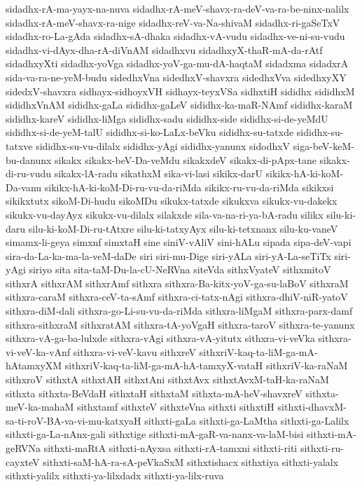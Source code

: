 {sidadhx-rA-ma-yayx-na-nuva
sidadhx-rA-meV-shavx-ra-deV-va-ra-be-ninx-nalilx
sidadhx-rA-meV-shavx-ra-nige
sidadhx-reV-va-Na-shivaM
sidadhx-ri-gaSeTxV
sidadhx-ro-La-gAda
sidadhx-sA-dhaka
sidadhx-vA-vudu
sidadhx-ve-ni-su-vudu
sidadhx-vi-dAyx-dha-rA-diVnAM
sidadhxvu
sidadhxyX-thaR-mA-da-rAtf
sidadhxyXti
sidadhx-yoVga
sidadhx-yoV-ga-mu-dA-haqtaM
sidadxma
sidadxrA
sida-va-ra-ne-yeM-budu
sidedhxVna
sidedhxV-shavxra
sidedhxVva
sidedhxyXY
sidedxV-shavxra
sidhayx-sidhoyxVH
sidhayx-teyxVSa
sidhxtiH
sididhx
sididhxM
sididhxVnAM
sididhx-gaLa
sididhx-gaLeV
sididhx-ka-maR-NAmf
sididhx-karaM
sididhx-kareV
sididhx-liMga
sididhx-sadu
sididhx-side
sididhx-si-de-yeMdU
sididhx-si-de-yeM-talU
sididhx-si-ko-LaLx-beVku
sididhx-su-tatxde
sididhx-su-tatxve
sididhx-su-vu-dilalx
sididhx-yAgi
sididhx-yanunx
sidodhxV
siga-beV-keM-bu-danunx
sikakx
sikakx-beV-Da-veMdu
sikakxdeV
sikakx-di-pApx-tane
sikakx-di-ru-vudu
sikakx-lA-radu
sikathxM
sika-vi-lasi
sikikx-darU
sikikx-hA-ki-koM-Da-vanu
sikikx-hA-ki-koM-Di-ru-vu-da-riMda
sikikx-ru-vu-da-riMda
sikikxsi
sikikxtutx
sikoM-Di-hudu
sikoMDu
sikukx-tatxde
sikukxva
sikukx-vu-dakekx
sikukx-vu-dayAyx
sikukx-vu-dilalx
silakxde
sila-va-na-ri-ya-bA-radu
silikx
silu-ki-daru
silu-ki-koM-Di-ru-tAtxre
silu-ki-tatxyAyx
silu-ki-tetxnanx
silu-ku-vaneV
simamx-li-geya
simxnf
simxtaH
sine
siniV-vAliV
sini-hALu
sipada
sipa-deV-vapi
sira-da-La-ka-ma-la-veM-daDe
siri
siri-mu-Dige
siri-yALa
siri-yA-La-seTiTx
siri-yAgi
siriyo
sita
sita-taM-Du-la-cU-NeRVna
siteVda
sithxVyateV
sithxmitoV
sithxrA
sithxrAM
sithxrAmf
sithxra
sithxra-Ba-kitx-yoV-ga-su-laBoV
sithxraM
sithxra-caraM
sithxra-ceV-ta-sAmf
sithxra-ci-tatx-nAgi
sithxra-dhiV-niR-yatoV
sithxra-diM-dali
sithxra-go-Li-su-vu-da-riMda
sithxra-liMgaM
sithxra-parx-damf
sithxra-sithxraM
sithxratAM
sithxra-tA-yoVgaH
sithxra-taroV
sithxra-te-yanunx
sithxra-vA-ga-ba-lulxde
sithxra-vAgi
sithxra-vA-yitutx
sithxra-vi-veVka
sithxra-vi-veV-ka-vAnf
sithxra-vi-veV-kavu
sithxreV
sithxriV-kaq-ta-liM-ga-mA-hAtamxyXM
sithxriV-kaq-ta-liM-ga-mA-hA-tamxyX-vataH
sithxriV-ka-raNaM
sithxroV
sithxtA
sithxtAH
sithxtAni
sithxtAvx
sithxtAvxM-taH-ka-raNaM
sithxta
sithxta-BeVdaH
sithxtaH
sithxtaM
sithxta-mA-heV-shavxreV
sithxta-meV-ka-mahaM
sithxtamf
sithxteV
sithxteVna
sithxti
sithxtiH
sithxti-dhavxM-sa-ti-roV-BA-va-vi-mu-katxyaH
sithxti-gaLa
sithxti-ga-LaMtha
sithxti-ga-Lalilx
sithxti-ga-La-nAnx-gali
sithxtige
sithxti-mA-gaR-va-nanx-va-laM-bisi
sithxti-mA-geRVNa
sithxti-maRtA
sithxti-nAyxsa
sithxti-rA-tamxni
sithxti-riti
sithxti-ru-cayxteV
sithxti-saM-hA-ra-sA-peVkaSxM
sithxtishacx
sithxtiya
sithxti-yalalx
sithxti-yalilx
sithxti-ya-lilxdadx
sithxti-ya-lilx-ruva
}
